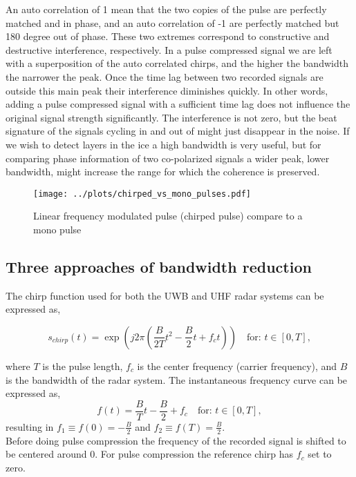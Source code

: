 \documentclass[]{article}
\begin{document}
An auto correlation of 1 mean that the two copies of the pulse are perfectly matched and in phase, and an auto correlation of -1 are perfectly matched but 180 degree out of phase. These two extremes correspond to constructive and destructive interference, respectively. In a pulse compressed signal we are left with a superposition of the auto correlated chirps, and the higher the bandwidth the narrower the peak. Once the time lag between two recorded signals are outside this main peak their interference diminishes quickly. In other words, adding a pulse compressed signal with a sufficient time lag does not influence the original signal strength significantly. The interference is not zero, but the beat signature of the signals cycling in and out of might just disappear in the noise. If we wish to detect layers in the ice a high bandwidth is very useful, but for comparing phase information of two co-polarized signals a wider peak, lower bandwidth, might increase the range for which the coherence is preserved.
\begin{figure}
	\texttt{[image: ../plots/chirped\_vs\_mono\_pulses.pdf]}
	\caption{Linear frequency modulated pulse (chirped pulse) compare to a mono pulse}
	\label{fig:chirped_vs_mono}
\end{figure}


\subsection{Three approaches of bandwidth reduction}
The chirp function used for both the UWB and UHF radar systems can be expressed as,

\begin{equation}
	s_{chirp}(t) = \exp\left( j2\pi \left( \frac{B}{2T} t^2 - \frac{B}{2}t + f_c t \right) \right) \quad \text{for: } t\in [0,T],
\end{equation}

where $T$ is the pulse length, $f_c$ is the center frequency (carrier frequency), and $B$ is the bandwidth of the radar system.
The instantaneous frequency curve can be expressed as,
\begin{equation}
	f(t) = \frac{B}{T} t - \frac{B}{2} + f_c \quad \text{for: } t\in[0,T],
\end{equation}
resulting in $f_1 \equiv f(0) = -\tfrac{B}{2}$ and $f_2 \equiv  f(T) = \tfrac{B}{2}$.\\
Before doing pulse compression the frequency of the recorded signal is shifted to be centered around 0. For pulse compression the reference chirp has $f_c$ set to zero. 
\end{document}
